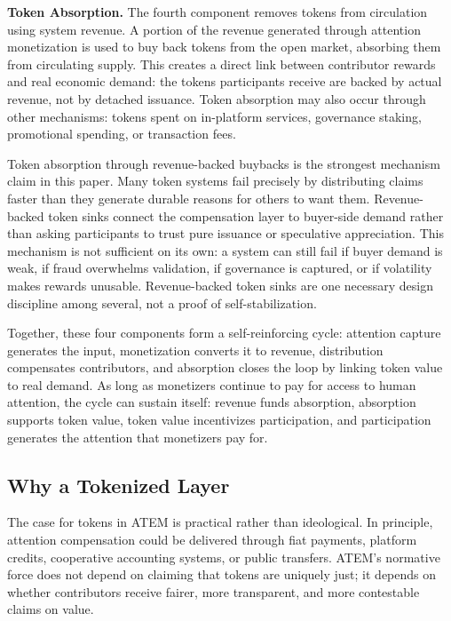 \documentclass[12pt, a4paper]{article}
\begin{document}
\textbf{Token Absorption.} The fourth component removes tokens from circulation using system revenue. A portion of the revenue generated through attention monetization is used to buy back tokens from the open market, absorbing them from circulating supply. This creates a direct link between contributor rewards and real economic demand: the tokens participants receive are backed by actual revenue, not by detached issuance. Token absorption may also occur through other mechanisms: tokens spent on in-platform services, governance staking, promotional spending, or transaction fees.

Token absorption through revenue-backed buybacks is the strongest mechanism claim in this paper. Many token systems fail precisely by distributing claims faster than they generate durable reasons for others to want them. Revenue-backed token sinks connect the compensation layer to buyer-side demand rather than asking participants to trust pure issuance or speculative appreciation. This mechanism is not sufficient on its own: a system can still fail if buyer demand is weak, if fraud overwhelms validation, if governance is captured, or if volatility makes rewards unusable. Revenue-backed token sinks are one necessary design discipline among several, not a proof of self-stabilization.

Together, these four components form a self-reinforcing cycle: attention capture generates the input, monetization converts it to revenue, distribution compensates contributors, and absorption closes the loop by linking token value to real demand. As long as monetizers continue to pay for access to human attention, the cycle can sustain itself: revenue funds absorption, absorption supports token value, token value incentivizes participation, and participation generates the attention that monetizers pay for.

\subsection{Why a Tokenized Layer}
\label{sec:atem-tokens}

The case for tokens in ATEM is practical rather than ideological. In principle, attention compensation could be delivered through fiat payments, platform credits, cooperative accounting systems, or public transfers. ATEM's normative force does not depend on claiming that tokens are uniquely just; it depends on whether contributors receive fairer, more transparent, and more contestable claims on value.
\end{document}
